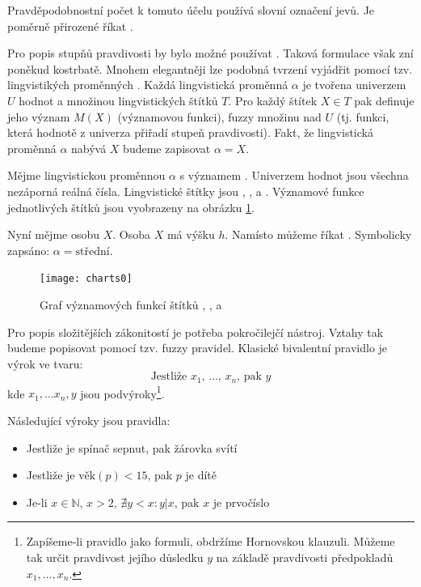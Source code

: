 \documentclass[a4paper,10pt]{article}
\begin{document}
Pravděpodobnostní počet k tomuto účelu používá slovní označení jevů. Je poměrně přirozené říkat .

Pro popis stupňů pravdivosti by bylo možné používat . Taková formulace však zní poněkud kostrbatě. Mnohem elegantněji lze podobná tvrzení vyjádřit pomocí tzv. lingvistikých proměnných \cite{Zad-ConLingVarAppApprRea}. Každá lingvistická proměnná $\alpha$ je tvořena univerzem $U$ hodnot a množinou lingvistických štítků $T$. Pro každý štítek $X \in T$ pak definuje jeho význam $M(X)$ (významovou funkci), fuzzy množinu nad $U$ (tj. funkci, která hodnotě z univerza přiřadí stupeň pravdivosti). Fakt, že lingvistická proměnná $\alpha$ nabývá  $X$ budeme zapisovat $\alpha = X$.

\begin{example}
 Mějme lingvistickou proměnnou $\alpha$ s významem . Univerzem hodnot jsou všechna nezáporná reálná čísla. Lingvistické štítky jsou , ,  a . Významové funkce jednotlivých štítků jsou vyobrazeny na obrázku \ref{fig:lingVarsMeansChart}.

 Nyní mějme osobu $X$. Osoba $X$ má výšku $h$. Namísto  můžeme říkat . Symbolicky zapsáno: $\alpha = \text{střední}$.
\end{example}

\begin{figure}
 \centering
 \texttt{[image: charts0]}
 
 \caption{Graf významových funkcí štítků , ,  a } \label{fig:lingVarsMeansChart}
\end{figure}

Pro popis složitějších zákonitostí je potřeba pokročilejčí nástroj. Vztahy tak budeme popisovat pomocí tzv. fuzzy \ifthen pravidel\cite{Jan-FouFuzzContPracAppr}. Klasické bivalentní \ifthen pravidlo je výrok ve tvaru:
$$
 \text{Jestliže $x_1$, $\dots$, $x_n$, pak $y$}
$$
kde $x_1, \dots x_n, y$ jsou podvýroky\footnote{Zapíšeme-li \ifthen pravidlo jako formuli, obdržíme Hornovskou klauzuli. Můžeme tak určit pravdivost jejího důsledku $y$ na základě pravdivosti předpokladů $x_1, \dots, x_n$.}.

\begin{example}
 Následující výroky jsou \ifthen pravidla:
 \begin{itemize}
  \item Jestliže je spínač sepnut, pak žárovka svítí
  \item Jestliže je $\text{věk}(p) < 15$, pak $p$ je dítě
  \item Je-li $x \in \mathbb{N}$, $x > 2$, $\nexists y < x: y|x$, pak $x$ je prvočíslo
 \end{itemize}
\end{example}
\end{document}
